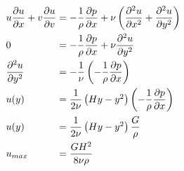 \documentclass[
	pdftex,             %
	12pt,				%
	a4paper,		   	%
	english,				%
	oneside,			%
]{article}
\begin{document}
\begin{eqnarray}
\begin{split}
\arraycolsep=1.4pt\def\arraystretch{2.2}
\begin{array}{lcl}
u\dfrac{\partial u}{\partial x} + v\dfrac{\partial u}{\partial v}
&=& 
-\dfrac{1}{\rho} \dfrac{\partial p}{\partial x}
+ \nu \left( \dfrac{\partial^2 u}{\partial x^2} + \dfrac{\partial^2 u}{\partial y^2} \right)
\\
0 &=& -\dfrac{1}{\rho} \dfrac{\partial p}{\partial x} + \nu \dfrac{\partial^2 u}{\partial y^2}
\\
\dfrac{\partial^2 u}{\partial y^2} 
&=&
-\dfrac{1}{\nu} \left( -\dfrac{1}{\rho} \dfrac{\partial p}{\partial x} \right)
\\
u(y) &=& \dfrac{1}{2\nu} \left( Hy - y^2 \right) 
         \left( -\dfrac{1}{\rho} \dfrac{\partial p}{\partial x} \right)
\\
u(y) &=& \dfrac{1}{2\nu} \left( Hy - y^2 \right) \dfrac{G}{\rho}
\\
u_{max} &=& \dfrac{GH^2}{8\nu\rho}
\end{array}
\end{split}
\end{eqnarray}
\end{document}
